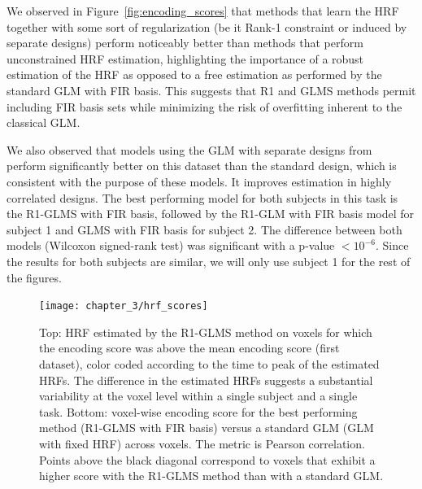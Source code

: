 We observed in Figure~\ref{fig:encoding_scores} that methods that learn the HRF
together with some sort of regularization (be it Rank-1 constraint or induced
by separate designs) perform noticeably better than methods that perform
unconstrained HRF estimation, highlighting the importance of a robust
estimation of the HRF as opposed to a free estimation as performed by the
standard GLM with FIR basis. This suggests that R1 and GLMS methods permit
 including FIR basis sets while minimizing the risk of overfitting inherent to the classical GLM.

We also observed that models using the GLM
with separate designs from~\citep{Mumford2012} perform significantly better on
this dataset than the standard design, which is consistent with the purpose of
these models. It improves estimation in highly correlated designs. The best
performing model for both subjects in this task is the R1-GLMS with FIR basis, followed by
the R1-GLM with FIR basis model for subject 1 and GLMS with FIR basis for
subject 2. The difference between both models (Wilcoxon signed-rank test) was
significant with a p-value $< 10^{-6}$. Since the results for both
subjects are similar, we will only use subject 1 for the rest of the figures.

\begin{figure}
\centering
\texttt{[image: chapter\_3/hrf\_scores]}
\caption{\label{fig:r1_vs_can}
Top: HRF estimated by the R1-GLMS method on voxels for which the encoding score was
above the mean encoding score (first dataset), color coded according to the time to peak 
of the estimated HRFs. 
The difference in the estimated HRFs suggests a substantial variability at the voxel level 
within a single subject and a single task. Bottom: voxel-wise encoding score 
for the best
performing method (R1-GLMS with FIR basis) versus a standard GLM (GLM with fixed HRF)
across voxels. The metric is Pearson correlation. Points 
above the black diagonal correspond to voxels that exhibit a higher score with the R1-GLMS
method than with a standard GLM.
}
\end{figure}


